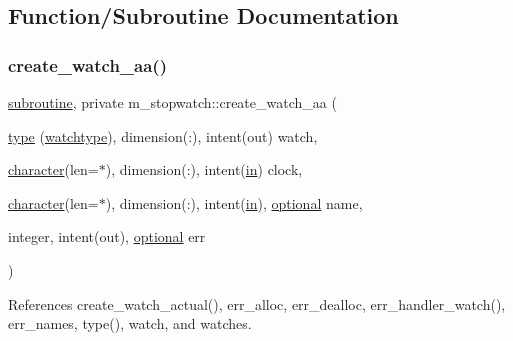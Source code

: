 \subsection{Function/\+Subroutine Documentation}
\mbox{\label{namespacem__stopwatch_a20bb67096d0fa8c6d12c8ae0022cc815}} 
\subsubsection{\texorpdfstring{create\+\_\+watch\+\_\+aa()}{create\_watch\_aa()}}
{\footnotesize\ttfamily \hyperlink{M__stopwatch_83_8txt_acfbcff50169d691ff02d4a123ed70482}{subroutine}, private m\+\_\+stopwatch\+::create\+\_\+watch\+\_\+aa (\begin{DoxyParamCaption}\item[{\hyperlink{stop__watch_83_8txt_a70f0ead91c32e25323c03265aa302c1c}{type} (\hyperlink{structm__stopwatch_1_1watchtype}{watchtype}), dimension(\+:), intent(out)}]{watch,  }\item[{\hyperlink{option__stopwatch_83_8txt_abd4b21fbbd175834027b5224bfe97e66}{character}(len=$\ast$), dimension(\+:), intent(\hyperlink{M__journal_83_8txt_afce72651d1eed785a2132bee863b2f38}{in})}]{clock,  }\item[{\hyperlink{option__stopwatch_83_8txt_abd4b21fbbd175834027b5224bfe97e66}{character}(len=$\ast$), dimension(\+:), intent(\hyperlink{M__journal_83_8txt_afce72651d1eed785a2132bee863b2f38}{in}), \hyperlink{option__stopwatch_83_8txt_aa4ece75e7acf58a4843f70fe18c3ade5}{optional}}]{name,  }\item[{integer, intent(out), \hyperlink{option__stopwatch_83_8txt_aa4ece75e7acf58a4843f70fe18c3ade5}{optional}}]{err }\end{DoxyParamCaption})\hspace{0.3cm}{\ttfamily [private]}}



References create\+\_\+watch\+\_\+actual(), err\+\_\+alloc, err\+\_\+dealloc, err\+\_\+handler\+\_\+watch(), err\+\_\+names, type(), watch, and watches.

\mbox{\label{namespacem__stopwatch_aa5b637cf7ea111bd835ea3c0224ae8d6}} 
